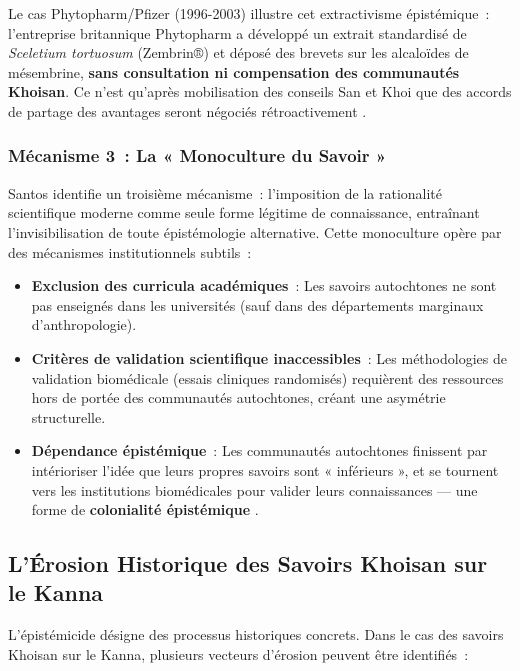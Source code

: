 \documentclass[12pt,a4paper,twoside]{book}
\newcommand{\kanna}{\textit{Sceletium tortuosum}}
\begin{document}
Le cas Phytopharm/Pfizer (1996-2003) illustre cet extractivisme épistémique~: l'entreprise britannique Phytopharm a développé un extrait standardisé de \kanna{} (Zembrin®) et déposé des brevets sur les alcaloïdes de mésembrine, \textbf{sans consultation ni compensation des communautés Khoisan}. Ce n'est qu'après mobilisation des conseils San et Khoi que des accords de partage des avantages seront négociés rétroactivement \parencite{wynberg2009}.

\subsubsection{Mécanisme 3~: La « Monoculture du Savoir »}

Santos identifie un troisième mécanisme~: l'imposition de la rationalité scientifique moderne comme seule forme légitime de connaissance, entraînant l'invisibilisation de toute épistémologie alternative. Cette monoculture opère par des mécanismes institutionnels subtils~:

\begin{itemize}
\item \textbf{Exclusion des curricula académiques}~: Les savoirs autochtones ne sont pas enseignés dans les universités (sauf dans des départements marginaux d'anthropologie).

\item \textbf{Critères de validation scientifique inaccessibles}~: Les méthodologies de validation biomédicale (essais cliniques randomisés) requièrent des ressources hors de portée des communautés autochtones, créant une asymétrie structurelle.

\item \textbf{Dépendance épistémique}~: Les communautés autochtones finissent par intérioriser l'idée que leurs propres savoirs sont « inférieurs », et se tournent vers les institutions biomédicales pour valider leurs connaissances --- une forme de \textbf{colonialité épistémique} \parencite{quijano2000}.
\end{itemize}

\subsection{L'Érosion Historique des Savoirs Khoisan sur le Kanna}

L'épistémicide désigne des processus historiques concrets. Dans le cas des savoirs Khoisan sur le Kanna, plusieurs vecteurs d'érosion peuvent être identifiés~:
\end{document}
